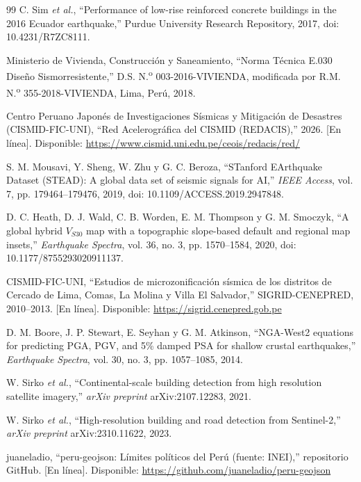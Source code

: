 \documentclass[conference]{IEEEtran}%
\begin{document}
\begin{thebibliography}{99}
C. Sim \emph{et al.}, ``Performance of low-rise reinforced concrete buildings in the 2016 Ecuador earthquake,'' Purdue University Research Repository, 2017, doi: 10.4231/R7ZC8111.

Ministerio de Vivienda, Construcción y Saneamiento, ``Norma Técnica E.030 Diseño Sismorresistente,'' D.S. N.\textsuperscript{o} 003-2016-VIVIENDA, modificada por R.M. N.\textsuperscript{o} 355-2018-VIVIENDA, Lima, Perú, 2018.

Centro Peruano Japonés de Investigaciones Sísmicas y Mitigación de Desastres (CISMID-FIC-UNI), ``Red Acelerográfica del CISMID (REDACIS),'' 2026. [En línea]. Disponible: \url{https://www.cismid.uni.edu.pe/ceois/redacis/red/}

S. M. Mousavi, Y. Sheng, W. Zhu y G. C. Beroza, ``STanford EArthquake Dataset (STEAD): A global data set of seismic signals for AI,'' \emph{IEEE Access}, vol. 7, pp. 179464--179476, 2019, doi: 10.1109/ACCESS.2019.2947848.

D. C. Heath, D. J. Wald, C. B. Worden, E. M. Thompson y G. M. Smoczyk, ``A global hybrid $V_{S30}$ map with a topographic slope-based default and regional map insets,'' \emph{Earthquake Spectra}, vol. 36, no. 3, pp. 1570--1584, 2020, doi: 10.1177/8755293020911137.

CISMID-FIC-UNI, ``Estudios de microzonificación sísmica de los distritos de Cercado de Lima, Comas, La Molina y Villa El Salvador,'' SIGRID-CENEPRED, 2010--2013. [En línea]. Disponible: \url{https://sigrid.cenepred.gob.pe}

D. M. Boore, J. P. Stewart, E. Seyhan y G. M. Atkinson, ``NGA-West2 equations for predicting PGA, PGV, and 5\% damped PSA for shallow crustal earthquakes,'' \emph{Earthquake Spectra}, vol. 30, no. 3, pp. 1057--1085, 2014.

W. Sirko \emph{et al.}, ``Continental-scale building detection from high resolution satellite imagery,'' \emph{arXiv preprint} arXiv:2107.12283, 2021.

W. Sirko \emph{et al.}, ``High-resolution building and road detection from Sentinel-2,'' \emph{arXiv preprint} arXiv:2310.11622, 2023.

juaneladio, ``peru-geojson: Límites políticos del Perú (fuente: INEI),'' repositorio GitHub. [En línea]. Disponible: \url{https://github.com/juaneladio/peru-geojson}


\end{thebibliography}
\end{document}

